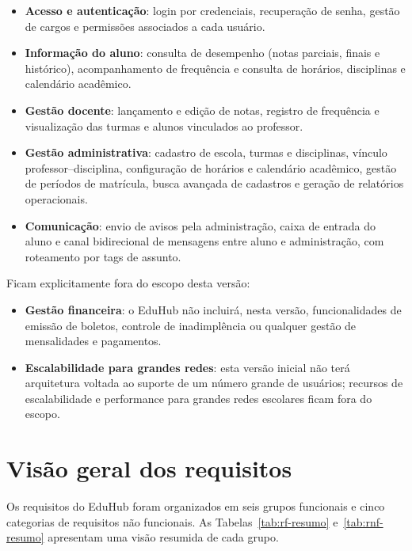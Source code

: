 \begin{itemize}[nosep]
    \item \textbf{Acesso e autenticação}: login por credenciais, recuperação
    de senha, gestão de cargos e permissões associados a cada usuário.
    \item \textbf{Informação do aluno}: consulta de desempenho (notas
    parciais, finais e histórico), acompanhamento de frequência e consulta
    de horários, disciplinas e calendário acadêmico.
    \item \textbf{Gestão docente}: lançamento e edição de notas, registro de
    frequência e visualização das turmas e alunos vinculados ao professor.
    \item \textbf{Gestão administrativa}: cadastro de escola, turmas e
    disciplinas, vínculo professor--disciplina, configuração de horários e
    calendário acadêmico, gestão de períodos de matrícula, busca avançada de
    cadastros e geração de relatórios operacionais.
    \item \textbf{Comunicação}: envio de avisos pela administração, caixa de
    entrada do aluno e canal bidirecional de mensagens entre aluno e
    administração, com roteamento por tags de assunto.
\end{itemize}

Ficam explicitamente fora do escopo desta versão:

\begin{itemize}[nosep]
    \item \textbf{Gestão financeira}: o EduHub não incluirá, nesta versão,
    funcionalidades de emissão de boletos, controle de inadimplência ou
    qualquer gestão de mensalidades e pagamentos.
    \item \textbf{Escalabilidade para grandes redes}: esta versão inicial
    não terá arquitetura voltada ao suporte de um número grande de usuários;
    recursos de escalabilidade e performance para grandes redes escolares
    ficam fora do escopo.
\end{itemize}

\section{Visão geral dos requisitos}

Os requisitos do EduHub foram organizados em seis grupos funcionais e cinco
categorias de requisitos não funcionais. As Tabelas~\ref{tab:rf-resumo}
e~\ref{tab:rnf-resumo} apresentam uma visão resumida de cada grupo.

